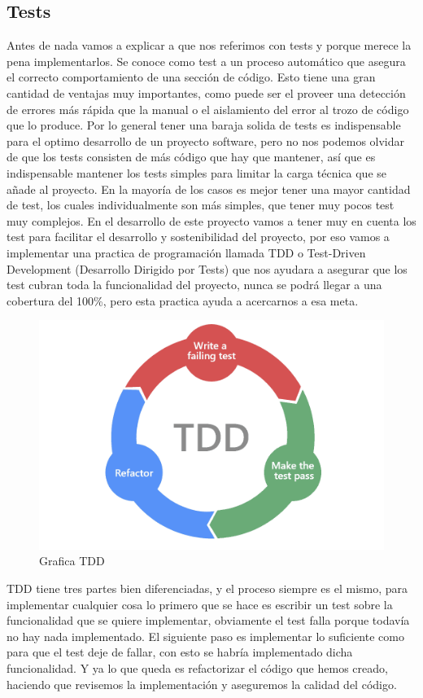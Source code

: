 \documentclass[12pt,a4paper]{article}
\begin{document}
	\subsection{Tests}
	Antes de nada vamos a explicar a que nos referimos con tests y porque merece la pena implementarlos. Se conoce como test a un proceso automático que asegura el correcto comportamiento de una sección de código. Esto tiene una gran cantidad de ventajas muy importantes, como puede ser el proveer una detección de errores más rápida que la manual o el aislamiento del error al trozo de código que lo produce. Por lo general tener una baraja solida de tests es indispensable para el optimo desarrollo de un proyecto software, pero no nos podemos olvidar de que los tests consisten de más código que hay que mantener, así que es indispensable mantener los tests simples para limitar la carga técnica que se añade al proyecto. En la mayoría de los casos es mejor tener una mayor cantidad de test, los cuales individualmente son más simples, que tener muy pocos test muy complejos.
	En el desarrollo de este proyecto vamos a tener muy en cuenta los test para facilitar el desarrollo y sostenibilidad del proyecto, por eso vamos a implementar una practica de programación llamada TDD o Test-Driven Development (Desarrollo Dirigido por Tests) que nos ayudara a asegurar que los test cubran toda la funcionalidad del proyecto, nunca se podrá llegar a una cobertura del 100\%, pero esta practica ayuda a acercarnos a esa meta.\\
\begin{figure}[H]
\centering
  \centering
  \includegraphics[width=0.5\linewidth]{test-driven-development-TDD}
\caption{Grafica TDD}
\label{fig:subrgrafo}
\end{figure}
	TDD tiene tres partes bien diferenciadas, y el proceso siempre es el mismo, para implementar cualquier cosa lo primero que se hace es escribir un test sobre la funcionalidad que se quiere implementar, obviamente el test falla porque todavía no hay nada implementado. El siguiente paso es implementar lo suficiente como para que el test deje de fallar, con esto se habría implementado dicha funcionalidad. Y ya lo que queda es refactorizar el código que hemos creado, haciendo que revisemos la implementación y aseguremos la calidad del código.\\
\end{document}
